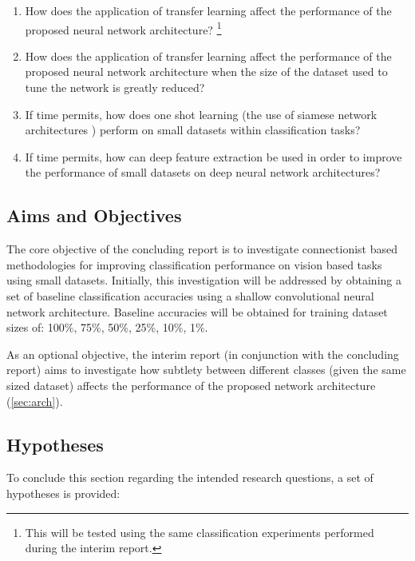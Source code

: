 \documentclass{article}
\begin{document}
\begin{enumerate}
  \item How does the application of transfer learning affect the performance of the proposed neural network architecture? \footnote{This will be tested using the same classification experiments performed during the interim report.}
  \item How does the application of transfer learning affect the performance of the proposed neural network architecture when the size of the dataset used to tune the network is greatly reduced?
  \item If time permits, how does one shot learning (the use of siamese network architectures \cite{bromley1994signature}\cite{oslsiamese}) perform on small datasets within classification tasks?
  \item If time permits, how can deep feature extraction be used in order to improve the performance of small datasets on deep neural network architectures?
\end{enumerate}

\subsection{Aims and Objectives}
\label{sec:objectives}

The core objective of the concluding report is to investigate connectionist based methodologies for improving classification performance on vision based tasks using small datasets. Initially, this investigation will be addressed by obtaining a set of baseline classification accuracies using a shallow convolutional neural network architecture. Baseline accuracies will be obtained for training dataset sizes of: 100\%, 75\%, 50\%, 25\%, 10\%, 1\%.

As an optional objective, the interim report (in conjunction with the concluding report) aims to investigate how subtlety between different classes (given the same sized dataset) affects the performance of the proposed network architecture (\ref{sec:arch}).

\subsection{Hypotheses}
\label{sec:hypotheses}

To conclude this section regarding the intended research questions, a set of hypotheses is provided:
\end{document}
